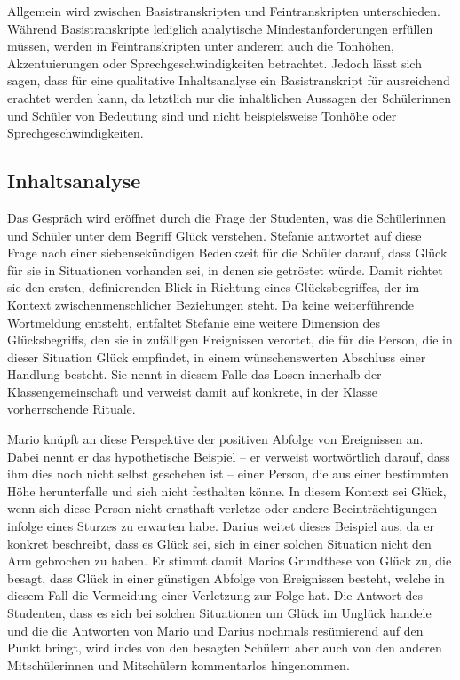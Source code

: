 Allgemein wird zwischen Basistranskripten und Feintranskripten unterschieden. 
Während Basistranskripte lediglich analytische Mindestanforderungen erfüllen müssen, werden in Feintranskripten unter anderem auch die Tonhöhen, Akzentuierungen oder Sprechgeschwindigkeiten betrachtet.
Jedoch lässt sich sagen, dass für eine qualitative Inhaltsanalyse ein Basistranskript für ausreichend erachtet werden kann, da letztlich nur die inhaltlichen Aussagen der Schülerinnen und Schüler von Bedeutung sind und nicht beispielsweise Tonhöhe oder Sprechgeschwindigkeiten.


\newpage


\subsection{Inhaltsanalyse}

Das Gespräch wird eröffnet durch die Frage der Studenten, was die Schülerinnen und Schüler unter dem Begriff Glück verstehen. 
Stefanie antwortet auf diese Frage nach einer siebensekündigen Bedenkzeit für die Schüler darauf, dass Glück für sie in Situationen vorhanden sei, in denen sie getröstet würde. 
Damit richtet sie den ersten, definierenden Blick in Richtung eines Glücksbegriffes, der im Kontext zwischenmenschlicher Beziehungen steht. 
Da keine weiterführende Wortmeldung entsteht, entfaltet Stefanie eine weitere Dimension des Glücksbegriffs, den sie in zufälligen Ereignissen verortet, die für die Person, die in dieser Situation Glück empfindet, in einem wünschenswerten Abschluss einer Handlung besteht. 
Sie nennt in diesem Falle das Losen innerhalb der Klassengemeinschaft und verweist damit auf konkrete, in der Klasse vorherrschende Rituale. 

Mario knüpft an diese Perspektive der positiven Abfolge von Ereignissen an. 
Dabei nennt er das hypothetische Beispiel -- er verweist wortwörtlich darauf, dass ihm dies noch nicht selbst geschehen ist -- einer Person, die aus einer bestimmten Höhe herunterfalle und sich nicht festhalten könne. 
In diesem Kontext sei Glück, wenn sich diese Person nicht ernsthaft verletze oder andere Beeinträchtigungen infolge eines Sturzes zu erwarten habe. 
Darius weitet dieses Beispiel aus, da er konkret beschreibt, dass es Glück sei, sich in einer solchen Situation nicht den Arm gebrochen zu haben.
Er stimmt damit Marios Grundthese von Glück zu, die besagt, dass Glück in einer günstigen Abfolge von Ereignissen besteht, welche in diesem Fall die Vermeidung einer Verletzung zur Folge hat. 
Die Antwort des Studenten, dass es sich bei solchen Situationen um Glück im Unglück handele und die die Antworten von Mario und Darius nochmals resümierend auf den Punkt bringt, wird indes von den besagten Schülern aber auch von den anderen Mitschülerinnen und Mitschülern kommentarlos hingenommen.

